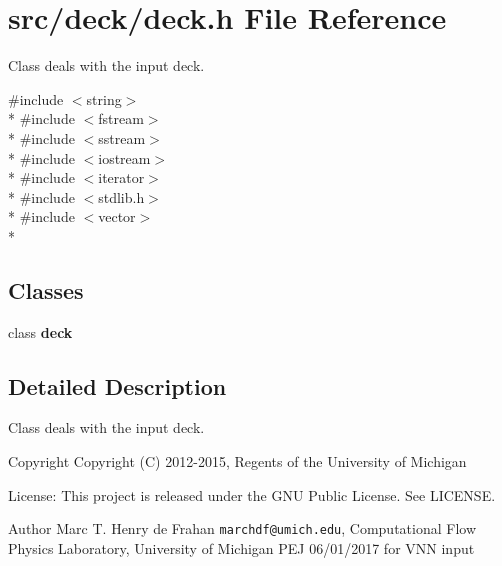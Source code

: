 \section{src/deck/deck.h File Reference}
\label{deck_8h}


Class deals with the input deck.  


{\ttfamily \#include $<$string$>$}\\*
{\ttfamily \#include $<$fstream$>$}\\*
{\ttfamily \#include $<$sstream$>$}\\*
{\ttfamily \#include $<$iostream$>$}\\*
{\ttfamily \#include $<$iterator$>$}\\*
{\ttfamily \#include $<$stdlib.\-h$>$}\\*
{\ttfamily \#include $<$vector$>$}\\*
\subsection*{Classes}
\begin{DoxyCompactItemize}
\item 
class {\bf deck}
\end{DoxyCompactItemize}


\subsection{Detailed Description}
Class deals with the input deck. \begin{DoxyCopyright}{Copyright}
Copyright (C) 2012-\/2015, Regents of the University of Michigan 
\end{DoxyCopyright}
\begin{DoxyParagraph}{License\-:}
This project is released under the G\-N\-U Public License. See L\-I\-C\-E\-N\-S\-E. 
\end{DoxyParagraph}
\begin{DoxyAuthor}{Author}
Marc T. Henry de Frahan {\tt marchdf@umich.\-edu}, Computational Flow Physics Laboratory, University of Michigan  P\-E\-J 06/01/2017 for V\-N\-N input 
\end{DoxyAuthor}
